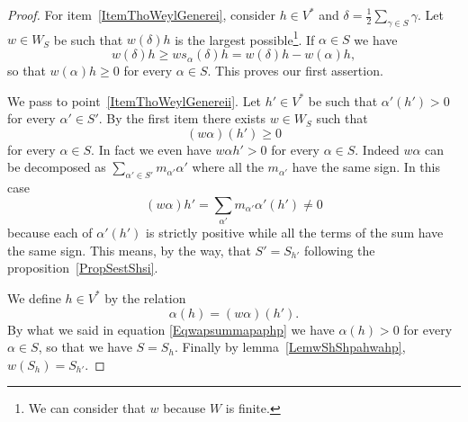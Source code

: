 \begin{proof}
    For item~\ref{ItemThoWeylGenerei}, consider \( h\in V^*\) and \( \delta=\frac{ 1 }{2}\sum_{\gamma\in S}\gamma\). Let \( w\in W_S\) be such that \( w(\delta)h\) is the largest possible\footnote{We can consider that \( w\) because \( W\) is finite.}. If \( \alpha\in S\) we have
    \begin{equation}
        w(\delta)h\geq ws_{\alpha}(\delta)h=w(\delta)h-w(\alpha)h,
    \end{equation}
    so that \( w(\alpha)h\geq 0\) for every \( \alpha\in S\). This proves our first assertion.

    We pass to point~\ref{ItemThoWeylGenereii}. Let \( h'\in V^*\) be such that \( \alpha'(h')> 0\) for every \( \alpha'\in S'\). By the first item there exists \( w\in W_S\) such that
    \begin{equation}
        (w\alpha)(h')\geq 0
    \end{equation}
    for every \( \alpha\in S\). In fact we even have \( w\alpha h'>0\) for every \( \alpha\in S\). Indeed \( w\alpha\) can be decomposed as \( \sum_{\alpha'\in S'}m_{\alpha'}\alpha'\) where all the \( m_{\alpha'}\) have the same sign. In this case
    \begin{equation}        \label{Eqwapsummapaphp}
        (w\alpha)h'=\sum_{\alpha'}m_{\alpha'}\alpha'(h')\neq 0
    \end{equation}
    because each of \( \alpha'(h')\) is strictly positive while all the terms of the sum have the same sign. This means, by the way, that \( S'=S_{h'}\) following the proposition~\ref{PropSestShsi}.

    We define \( h\in V^*\) by the relation
    \begin{equation}
        \alpha(h)=(w\alpha)(h').
    \end{equation}
    By what we said in equation \eqref{Eqwapsummapaphp} we have \( \alpha(h)>0\) for every \( \alpha\in S\), so that we have \( S=S_h\). Finally by lemma~\ref{LemwShShpahwahp}, \( w(S_h)=S_{h'}\).


\end{proof}
